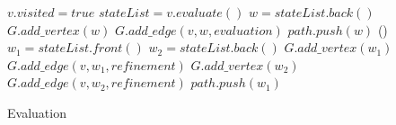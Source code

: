 \documentclass{article}
\begin{document}
\begin{algorithm}[H]
  $v.visited = true$\;
  $stateList = v.evaluate()$\;
   {
  }  {
    $w = stateList.back()$\;
    $G.add\_vertex(w)$\;
    $G.add\_edge(v,w,evaluation)$\;
    $path.push(w)$\;
  } \Else() {
    $w_1 = stateList.front()$\;
    $w_2 = stateList.back()$\;
    $G.add\_vertex(w_1)$\;
    $G.add\_edge(v,w_1,refinement)$\;
    $G.add\_vertex(w_2)$\;
    $G.add\_edge(v,w_2,refinement)$\;
    $path.push(w_1)$\;
  }
\caption{Evaluation}
\label{a:evaluation}
\end{algorithm}
\end{document}
